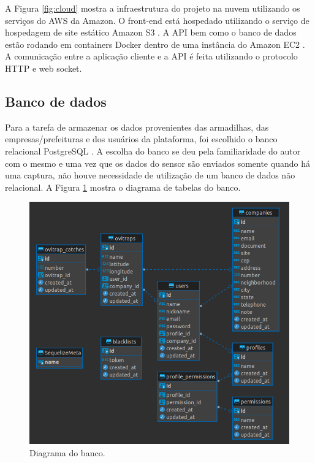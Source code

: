 \documentclass[
	12pt,				%
	openright,			%
	oneside,			%
	a4paper,			%
	chapter=TITLE,		%
	english,			%
	brazil				%
	]{abntex2}
\begin{document}
A Figura \ref{fig:cloud} mostra a infraestrutura do projeto na nuvem utilizando os serviços do AWS da Amazon. O front-end está hospedado
utilizando o serviço de hospedagem de site estático Amazon S3 \cite{S3}. A API bem como o banco de dados estão rodando em containers Docker \cite{DockerDoc} dentro de 
uma instância do Amazon EC2 \cite{DockerVideo}. A comunicação entre a aplicação cliente e a API é feita utilizando o protocolo HTTP e web socket.

\subsection{Banco de dados}

Para a tarefa de armazenar os dados provenientes das armadilhas, das empresas/prefeituras e dos usuários da plataforma, 
foi escolhido o banco relacional PostgreSQL \cite{PostgreSQL}. A escolha do banco se deu pela familiaridade do autor com o mesmo
e uma vez que os dados do sensor são enviados somente quando há uma captura, não houve necessidade de utilização de um banco de dados não relacional.
A Figura \ref{fig:banco} mostra o diagrama de tabelas do banco.

\begin{figure}[H]
\centering
\includegraphics[scale=0.5]{imagens/EsquemaBanco.png}
\caption{Diagrama do banco.}
    \label{fig:banco}
\end{figure}
\end{document}
